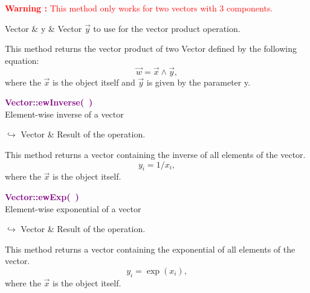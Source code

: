 \hspace*{10mm}\textcolor{red}{\textbf{Warning :} This method only works for two vectors with 3 components.}

\begin{tcolorbox}[width=\textwidth,myArgs,tabularx={ll|R}]
Vector & y & Vector $\overrightarrow{y}$ to use for the vector product operation.
\end{tcolorbox}

This method returns the vector product of two Vector defined by the following equation:
\begin{equation*}
\overrightarrow{w} = \overrightarrow{x}\land\overrightarrow{y},
\end{equation*}
where the $\overrightarrow{x}$ is the object itself and $\overrightarrow{y}$ is given by the parameter y.

\textcolor{purple}{\textbf{Vector::ewInverse(~)}}\label{Vector::ewInverse()}\\
Element-wise inverse of a vector\vspace*{-0.5em}
\begin{tcolorbox}[grow to left by=-1cm, width=\textwidth-1cm,myArgs,tabularx={l|R}]
$\hookrightarrow$ Vector & Result of the operation.
\end{tcolorbox}

This method returns a vector containing the inverse of all elements of the vector.
\begin{equation*}
y_i = 1/x_i,
\end{equation*}
where the $\overrightarrow{x}$ is the object itself.

\textcolor{purple}{\textbf{Vector::ewExp(~)}}\label{Vector::ewExp()}\\
Element-wise exponential of a vector\vspace*{-0.5em}
\begin{tcolorbox}[grow to left by=-1cm, width=\textwidth-1cm,myArgs,tabularx={l|R}]
$\hookrightarrow$ Vector & Result of the operation.
\end{tcolorbox}

This method returns a vector containing the exponential of all elements of the vector.
\begin{equation*}
y_i = \exp(x_i),
\end{equation*}
where the $\overrightarrow{x}$ is the object itself.


